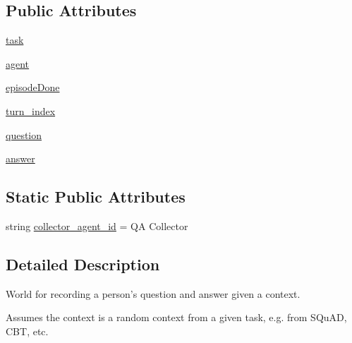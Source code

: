 \subsection*{Public Attributes}
\begin{DoxyCompactItemize}
\item 
\hyperlink{classparlai_1_1chat__service_1_1tasks_1_1qa__data__collection_1_1worlds_1_1QADataCollectionTaskWorld_a2299f4d3d23e9d08be9430814aad9472}{task}
\item 
\hyperlink{classparlai_1_1chat__service_1_1tasks_1_1qa__data__collection_1_1worlds_1_1QADataCollectionTaskWorld_a2070bf88d1309e9f11d402ae58ae58cb}{agent}
\item 
\hyperlink{classparlai_1_1chat__service_1_1tasks_1_1qa__data__collection_1_1worlds_1_1QADataCollectionTaskWorld_a323d04b0bdfdc0a1a58208df89c7b4ee}{episode\+Done}
\item 
\hyperlink{classparlai_1_1chat__service_1_1tasks_1_1qa__data__collection_1_1worlds_1_1QADataCollectionTaskWorld_a473083662ee62a677abf655340ce9b91}{turn\+\_\+index}
\item 
\hyperlink{classparlai_1_1chat__service_1_1tasks_1_1qa__data__collection_1_1worlds_1_1QADataCollectionTaskWorld_a85bad2e20f92f09ab9c1fd3567ee320f}{question}
\item 
\hyperlink{classparlai_1_1chat__service_1_1tasks_1_1qa__data__collection_1_1worlds_1_1QADataCollectionTaskWorld_a8cc30f53f73fc8606dc311431e05008f}{answer}
\end{DoxyCompactItemize}
\subsection*{Static Public Attributes}
\begin{DoxyCompactItemize}
\item 
string \hyperlink{classparlai_1_1chat__service_1_1tasks_1_1qa__data__collection_1_1worlds_1_1QADataCollectionTaskWorld_a42da66fd3f9b8dc03d94f7788d0d807c}{collector\+\_\+agent\+\_\+id} = \textquotesingle{}QA Collector\textquotesingle{}
\end{DoxyCompactItemize}


\subsection{Detailed Description}
\begin{DoxyVerb}World for recording a person's question and answer given a context.

Assumes the context is a random context from a given task, e.g. from SQuAD, CBT,
etc.
\end{DoxyVerb}
 

